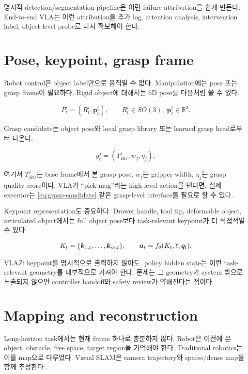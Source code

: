 명시적 detection/segmentation pipeline은 이런 failure attribution을 쉽게 만든다. End-to-end VLA는 이런 attribution을 추가 log, attention analysis, intervention label, object-level probe로 다시 확보해야 한다.

\section{Pose, keypoint, grasp frame}

Robot control은 object label만으로 움직일 수 없다. Manipulation에는 pose 또는 grasp frame이 필요하다. Rigid object에 대해서는 6D pose를 다음처럼 쓸 수 있다.

\begin{equation}
  P_t^i = (R_t^i,\bm{p}_t^i),\qquad R_t^i\in SO(3),\;\bm{p}_t^i\in\mathbb{R}^3.
  \label{eq:object-pose}
\end{equation}

Grasp candidate는 object pose와 local grasp library 또는 learned grasp head로부터 나온다.

\begin{equation}
  g_t^j = (T_{BG}^j, w_j, \eta_j),
  \label{eq:grasp-candidate}
\end{equation}

여기서 $T_{BG}^j$는 base frame에서 본 grasp pose, $w_j$는 gripper width, $\eta_j$는 grasp quality score이다. VLA가 ``pick mug''라는 high-level action을 낸다면, 실제 executor는 \cref{eq:grasp-candidate} 같은 grasp-level interface를 필요로 할 수 있다.

Keypoint representation도 중요하다. Drawer handle, tool tip, deformable object, articulated object에서는 full object pose보다 task-relevant keypoint가 더 직접적일 수 있다.

\begin{equation}
  K_t = \{\bm{k}_{1,t},\ldots,\bm{k}_{m,t}\},
  \qquad
  \bm{a}_t = f_{\theta}(K_t,\ell,\bm{q}_t).
  \label{eq:keypoint-action}
\end{equation}

VLA가 keypoint를 명시적으로 출력하지 않아도, policy hidden state는 이런 task-relevant geometry를 내부적으로 가져야 한다. 문제는 그 geometry가 system 밖으로 노출되지 않으면 controller handoff와 safety review가 약해진다는 점이다.

\section{Mapping and reconstruction}

Long-horizon task에서는 현재 frame 하나로 충분하지 않다. Robot은 이전에 본 object, obstacle, free space, target region을 기억해야 한다. Traditional robotics는 이를 map으로 다루었다. Visual SLAM은 camera trajectory와 sparse/dense map을 함께 추정한다 \cite{murartal2015orbslam}.

